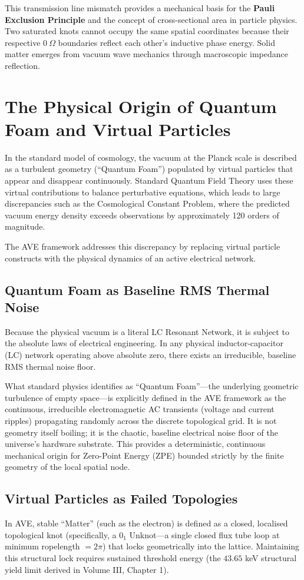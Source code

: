 This transmission line mismatch provides a mechanical basis for the \textbf{Pauli Exclusion Principle} and the concept of cross-sectional area in particle physics. Two saturated knots cannot occupy the same spatial coordinates because their respective $0 \ \Omega$ boundaries reflect each other's inductive phase energy. Solid matter emerges from vacuum wave mechanics through macroscopic impedance reflection.

\section{The Physical Origin of Quantum Foam and Virtual Particles}
In the standard model of cosmology, the vacuum at the Planck scale is described as a turbulent geometry (``Quantum Foam'') populated by virtual particles that appear and disappear continuously. Standard Quantum Field Theory uses these virtual contributions to balance perturbative equations, which leads to large discrepancies such as the Cosmological Constant Problem, where the predicted vacuum energy density exceeds observations by approximately 120 orders of magnitude.

The AVE framework addresses this discrepancy by replacing virtual particle constructs with the physical dynamics of an active electrical network.

\subsection{Quantum Foam as Baseline RMS Thermal Noise}
Because the physical vacuum is a literal LC Resonant Network, it is subject to the absolute laws of electrical engineering. In any physical inductor-capacitor (LC) network operating above absolute zero, there exists an irreducible, baseline RMS thermal noise floor. 

What standard physics identifies as ``Quantum Foam''---the underlying geometric turbulence of empty space---is explicitly defined in the AVE framework as the continuous, irreducible electromagnetic AC transients (voltage and current ripples) propagating randomly across the discrete topological grid. It is not geometry itself boiling; it is the chaotic, baseline electrical noise floor of the universe's hardware substrate. This provides a deterministic, continuous mechanical origin for Zero-Point Energy (ZPE) bounded strictly by the finite geometry of the local spatial node.

\subsection{Virtual Particles as Failed Topologies}
In AVE, stable ``Matter'' (such as the electron) is defined as a closed, localised topological knot (specifically, a $0_1$ Unknot---a single closed flux tube loop at minimum ropelength $= 2\pi$) that locks geometrically into the lattice. Maintaining this structural lock requires sustained threshold energy (the $43.65$ keV structural yield limit derived in Volume III, Chapter 1).

